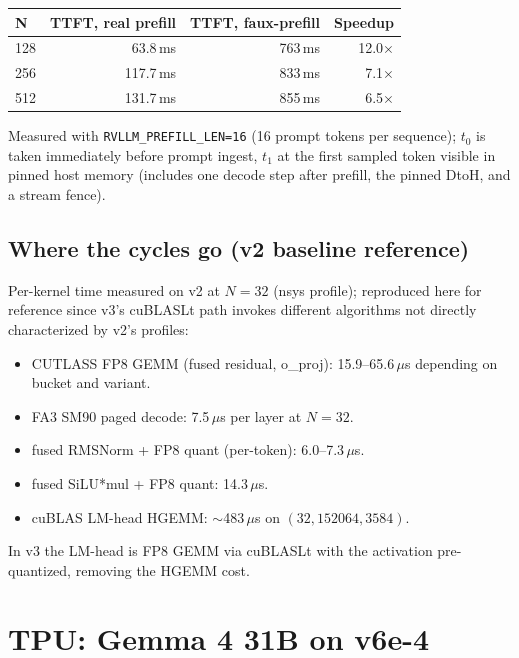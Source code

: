 \begin{tabular}{lrrr}
\toprule
\textbf{N} & \textbf{TTFT, real prefill} & \textbf{TTFT, faux-prefill} & \textbf{Speedup} \\
\midrule
128 & 63.8\,ms  & 763\,ms & 12.0$\times$ \\
256 & 117.7\,ms & 833\,ms &  7.1$\times$ \\
512 & 131.7\,ms & 855\,ms &  6.5$\times$ \\
\bottomrule
\end{tabular}

Measured with \texttt{RVLLM\_PREFILL\_LEN=16} (16 prompt tokens per
sequence); $t_0$ is taken immediately before prompt ingest, $t_1$ at the
first sampled token visible in pinned host memory (includes one decode
step after prefill, the pinned DtoH, and a stream fence).

\subsection{Where the cycles go (v2 baseline reference)}

Per-kernel time measured on v2 at $N\!=\!32$ (nsys profile); reproduced
here for reference since v3's cuBLASLt path invokes different algorithms
not directly characterized by v2's profiles:

\begin{itemize}
\item CUTLASS FP8 GEMM (fused residual, o\_proj): 15.9--65.6\,$\mu$s
  depending on bucket and variant.
\item FA3 SM90 paged decode: 7.5\,$\mu$s per layer at $N\!=\!32$.
\item fused RMSNorm + FP8 quant (per-token): 6.0--7.3\,$\mu$s.
\item fused SiLU*mul + FP8 quant: 14.3\,$\mu$s.
\item cuBLAS LM-head HGEMM: $\sim$483\,$\mu$s on $(32, 152064, 3584)$.
\end{itemize}

In v3 the LM-head is FP8 GEMM via cuBLASLt with the activation
pre-quantized, removing the HGEMM cost.

\section{TPU: Gemma 4 31B on v6e-4}
\label{sec:tpu}

